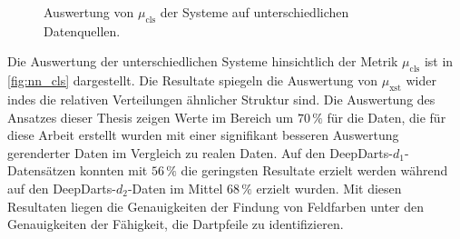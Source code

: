 \begin{figure}
    \centering
    \caption{Auswertung von $\mu_\text{cls}$ der Systeme auf unterschiedlichen Datenquellen.}
    \label{fig:nn_cls}
\end{figure}

Die Auswertung der unterschiedlichen Systeme hinsichtlich der Metrik $\mu_\text{cls}$ ist in \autoref{fig:nn_cls} dargestellt. Die Resultate spiegeln die Auswertung von $\mu_\text{xst}$ wider indes die relativen Verteilungen ähnlicher Struktur sind. Die Auswertung des Ansatzes dieser Thesis zeigen Werte im Bereich um $70\,\%$ für die Daten, die für diese Arbeit erstellt wurden mit einer signifikant besseren Auswertung gerenderter Daten im Vergleich zu realen Daten. Auf den DeepDarts-$d_1$-Datensätzen konnten mit $56\,\%$ die geringsten Resultate erzielt werden während auf den DeepDarts-$d_2$-Daten im Mittel $68\,\%$ erzielt wurden. Mit diesen Resultaten liegen die Genauigkeiten der Findung von Feldfarben unter den Genauigkeiten der Fähigkeit, die Dartpfeile zu identifizieren.

